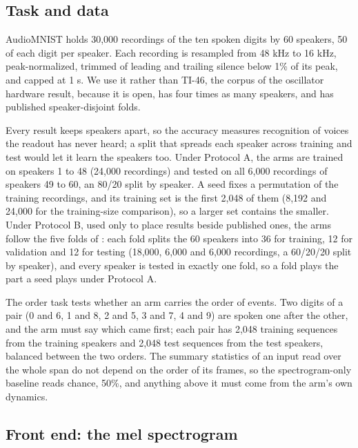 \documentclass[10pt]{article}
\begin{document}
\subsection{Task and data}\label{task-and-data}

AudioMNIST \citep{becker2024} holds 30,000 recordings of the ten spoken
digits by 60 speakers, 50 of each digit per speaker. Each recording is
resampled from 48 kHz to 16 kHz, peak-normalized, trimmed of leading and
trailing silence below 1\% of its peak, and capped at 1 s. We use it
rather than TI-46, the corpus of the oscillator hardware result, because
it is open, has four times as many speakers, and has published
speaker-disjoint folds.

Every result keeps speakers apart, so the accuracy measures recognition
of voices the readout has never heard; a split that spreads each speaker
across training and test would let it learn the speakers too. Under
Protocol A, the arms are trained on speakers 1 to 48 (24,000 recordings)
and tested on all 6,000 recordings of speakers 49 to 60, an 80/20 split
by speaker. A seed fixes a permutation of the training recordings, and
its training set is the first 2,048 of them (8,192 and 24,000 for the
training-size comparison), so a larger set contains the smaller. Under
Protocol B, used only to place results beside published ones, the arms
follow the five folds of \citet{becker2024}: each fold splits the 60
speakers into 36 for training, 12 for validation and 12 for testing
(18,000, 6,000 and 6,000 recordings, a 60/20/20 split by speaker), and
every speaker is tested in exactly one fold, so a fold plays the part a
seed plays under Protocol A.

The order task tests whether an arm carries the order of events. Two
digits of a pair (0 and 6, 1 and 8, 2 and 5, 3 and 7, 4 and 9) are
spoken one after the other, and the arm must say which came first; each
pair has 2,048 training sequences from the training speakers and 2,048
test sequences from the test speakers, balanced between the two orders.
The summary statistics of an input read over the whole span do not
depend on the order of its frames, so the spectrogram-only baseline
reads chance, 50\%, and anything above it must come from the arm's own
dynamics.

\subsection{Front end: the mel
spectrogram}\label{front-end-the-mel-spectrogram}
\end{document}
